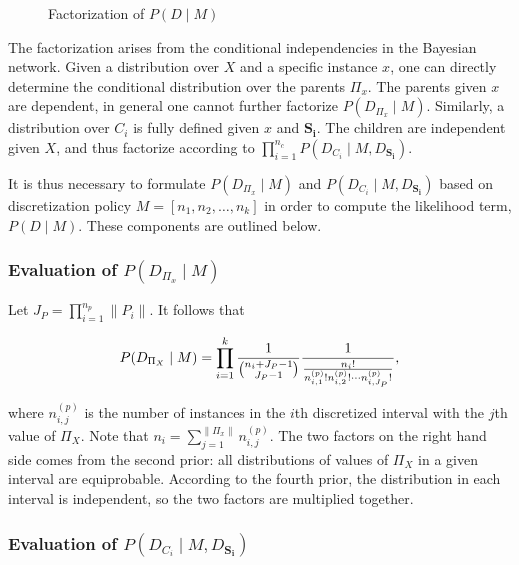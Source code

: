 \begin{figure}[ht]
    \begin{tabular}{cc}
      
    \end{tabular}
  \caption{Factorization of $P(D \mid M)$}
  \label{fig:one}
\end{figure}

The factorization arises from the conditional independencies in the Bayesian network.
Given a distribution over $X$ and a specific instance $x$, one can directly determine the conditional distribution over the parents $\Pi_x$.
The parents given $x$ are dependent, in general one cannot further factorize $P(D_{\Pi_x} \mid M)$.
Similarly, a distribution over $C_i$ is fully defined given $x$ and $\boldsymbol{S_i}$.
The children are independent given $X$, and thus factorize according to $\prod_{i = 1}^{n_c} P(D_{C_i} \mid M, D_{\boldsymbol{S_i}})$.

It is thus necessary to formulate $P(D_{\Pi_x} \mid M)$  and $P(D_{C_i} \mid M, D_{\boldsymbol{S_i}})$ based on discretization policy $M = [n_1,n_2,\ldots,n_k]$ in order to compute the likelihood term, $P(D \mid M)$. These components are outlined below.

\subsubsection{Evaluation of $P(D_{\Pi_x} \mid M)$}

Let $J_P = \prod_{i=1}^{n_p} \| P_i \|$. It follows that

\begin{equation}
\label{eq:likelihood_one}
P(D_{\Pi_X} \mid M) = \prod_{i=1}^k  {{1}\over{{n_i + J_P - 1}\choose{J_P -1}}}
{{1}\over{ {{{n}_i}!}\over{ {n^{(p)}_{i,1} !} {n^{(p)}_{i,2} !} \cdots {n^{(p)}_{i,J_P} !}}  }}\text{,}
\end{equation}

\noindent
where $n^{(p)}_{i,j}$ is the number of instances in the $i$th discretized interval with the $j$th value of $\Pi_X$.
Note that $n_i = \sum_{j=1}^{\| \Pi_x \|} n^{(p)}_{i,j}$.
The two factors on the right hand side comes from the second prior: all distributions of values of $\Pi_X$ in a given interval are equiprobable. According to the fourth prior, the distribution in each interval is independent, so the two factors are multiplied together.

\subsubsection{Evaluation of $P(D_{C_i} \mid M, D_{\boldsymbol{S_i}})$}

